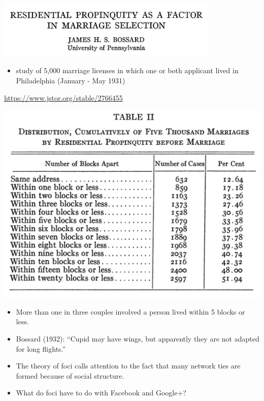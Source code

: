 \documentclass[aspectratio=169]{beamer}
\begin{document}
\begin{frame}

\begin{center}
 \includegraphics[width=0.8\textwidth]{figures/bossard_residential_1932_title}
\end{center}

\begin{itemize}
\item study of 5,000 marriage licenses in which one or both applicant lived in Philadelphia (January - May 1931)
\end{itemize}

\vfill
\url{https://www.jstor.org/stable/2766455 }

\end{frame}
\begin{frame}

\begin{center}
 \includegraphics[height=0.7\textheight]{figures/bossard_residential_1932_tab2}
\end{center}

\begin{itemize}
\item More than one in three couples involved a person lived within 5 blocks or less. 
\pause
\item Bossard (1932): ``Cupid may have wings, but apparently they are not adapted for long flights.''
\end{itemize}


\end{frame}
\begin{frame}

\begin{itemize}
\item The theory of foci calls attention to the fact that many network ties are formed because of social structure.
\pause
\item What do foci have to do with Facebook and Google+?
\end{itemize}

\end{frame}
\end{document}
